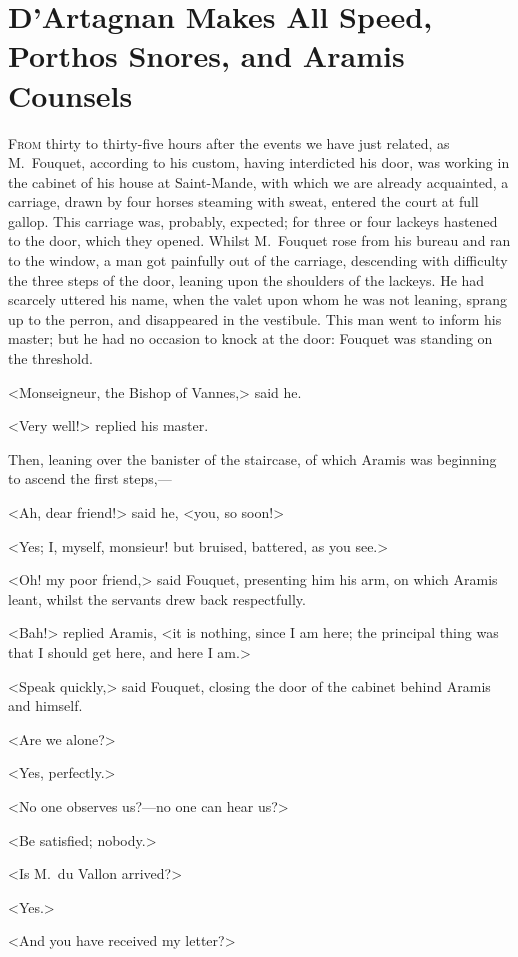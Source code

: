 \chapter{D'Artagnan Makes All Speed, Porthos Snores, and Aramis Counsels}

\lettrine{F}{rom} thirty to thirty-five hours after the events we have just related, as M.~Fouquet, according to his custom, having interdicted his door, was working in the cabinet of his house at Saint-Mande, with which we are already acquainted, a carriage, drawn by four horses steaming with sweat, entered the court at full gallop. This carriage was, probably, expected; for three or four lackeys hastened to the door, which they opened. Whilst M.~Fouquet rose from his bureau and ran to the window, a man got painfully out of the carriage, descending with difficulty the three steps of the door, leaning upon the shoulders of the lackeys. He had scarcely uttered his name, when the valet upon whom he was not leaning, sprang up to the perron, and disappeared in the vestibule. This man went to inform his master; but he had no occasion to knock at the door: Fouquet was standing on the threshold.

<Monseigneur, the Bishop of Vannes,> said he.

<Very well!> replied his master.

Then, leaning over the banister of the staircase, of which Aramis was beginning to ascend the first steps,—

<Ah, dear friend!> said he, <you, so soon!>

<Yes; I, myself, monsieur! but bruised, battered, as you see.>

<Oh! my poor friend,> said Fouquet, presenting him his arm, on which Aramis leant, whilst the servants drew back respectfully.

<Bah!> replied Aramis, <it is nothing, since I am here; the principal thing was that I should get here, and here I am.>

<Speak quickly,> said Fouquet, closing the door of the cabinet behind Aramis and himself.

<Are we alone?>

<Yes, perfectly.>

<No one observes us?—no one can hear us?>

<Be satisfied; nobody.>

<Is M.~du Vallon arrived?>

<Yes.>

<And you have received my letter?>


